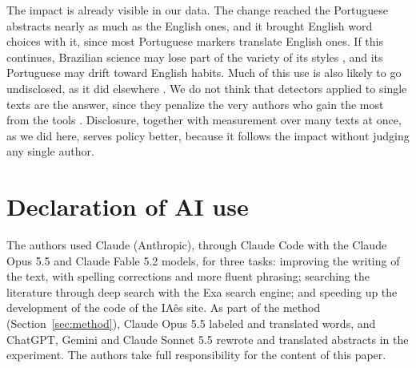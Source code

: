 \documentclass[12pt]{article}
\begin{document}
The impact is already visible in our data. The change
reached the Portuguese abstracts nearly as much as the English ones, and it brought English word
choices with it, since most Portuguese markers translate English ones. If this continues, Brazilian
science may lose part of the variety of its styles
\cite{agarwal2025homogenize,sourati2026shrinking}, and its Portuguese may drift toward English
habits. Much of this use is also likely to go undisclosed, as it did elsewhere
\cite{gray2024contamination,kwon2025ok}. We do not think that detectors applied to single texts are
the answer, since they penalize the very authors who gain the most from the tools
\cite{liang2023gpt}. Disclosure, together with measurement over many texts at once, as we did here,
serves policy better, because it follows the impact without judging any single author.

\section*{Declaration of AI use}

The authors used Claude (Anthropic), through Claude Code with the Claude Opus 5.5 and Claude Fable
5.2 models, for three tasks: improving the writing of the text, with spelling corrections and more
fluent phrasing; searching the literature through deep search with the Exa search engine; and
speeding up the development of the code of the IAês site. As part of the method
(Section~\ref{sec:method}), Claude Opus 5.5 labeled and translated words, and ChatGPT, Gemini and
Claude Sonnet 5.5 rewrote and translated abstracts in the experiment. The authors take full
responsibility for the content of this paper.



\end{document}
